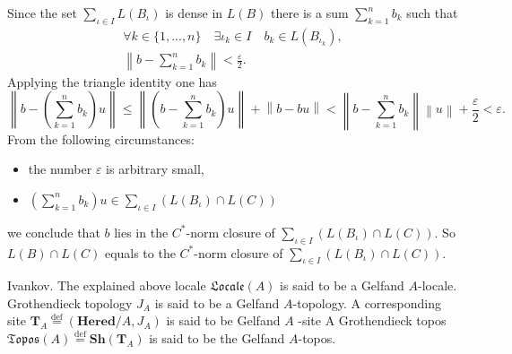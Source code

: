 \documentclass{beamer}
\theoremstyle{plain}
\newcommand{\bean}{\begin{eqnarray*}}
\newcommand{\eean}{\end{eqnarray*}}
\newcommand{\eps}{\varepsilon}                    %
\newcommand{\bydef}{\stackrel{\mathrm{def}}{=}}
\begin{document}
\begin{frame}
	
	Since the set $\sum_{\iota\in I}  L\left(B_\iota\right)$ is dense in $L\left(B\right)$ there is a sum $\sum_{k = 1}^n b_{k}$ such that
	\bean
	\forall k\in \{1,..., n\}\quad \exists \iota_k\in I \quad b_k \in L\left( B_{\iota_k}\right)  ,\\
	\left\|b - \sum_{k = 1}^n b_k \right\|< \frac{\eps}{2}.
	\eean
	Applying the triangle identity one has
	$$
	\left\|b -  \left( \sum_{k = 1}^n b_k\right)  u\right\|	\le 	\left\|\left( b -   \sum_{k = 1}^n b_k\right)  u\right\|+ \left\|b -   b  u\right\|< \left\| b -   \sum_{k = 1}^n b_k\right\|\left\|  u\right\|+ \frac{\eps}{2}< \eps.
	$$
	From the following circumstances:
	\begin{itemize}
		\item  the number $\eps$ is arbitrary small,
		\item $\left( \sum_{k = 1}^n b_k\right)  u\in \sum_{\iota\in I} \left( L\left(B_\iota\right)\cap L\left(C\right)\right)$
	\end{itemize}
	we conclude that $b$ lies in the $C^*$-norm closure of $\sum_{\iota\in I} \left( L\left(B_\iota\right)\cap L\left(C\right)\right)$. So $L\left(B\right)\cap L\left(C\right)$ equals to the $C^*$-norm closure of $\sum_{\iota\in I} \left( L\left(B_\iota\right)\cap L\left(C\right)\right)$.
\end{frame}
\begin{frame}
\begin{definition}\alert{Ivankov}.
	The explained above locale  $\mathfrak{Locale}\left(A \right)$ is said to be a \alert{Gelfand} $A$-\alert{locale}. Grothendieck topology $J_A$  is said to be a  \alert{Gelfand} $A$-\alert{topology}. A corresponding  site  $\mathbf{T}_A\bydef \left(\mathbf{Hered}/A, J_A\right)$ is said to be \alert{Gelfand}  $A$ -\alert{site} A Grothendieck topos $\mathfrak{Topos}(A)\bydef \mathbf{Sh}\left(\mathbf{T}_A \right)$ is said to be the \alert{Gelfand} $A$-\alert{topos}.
\end{definition}
\end{frame}
\end{document}
